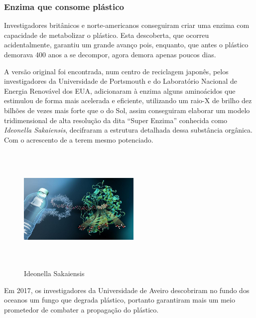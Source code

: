 \documentclass[letterpaper,12pt]{article}
\begin{document}
\subsubsection{Enzima que consome plástico}
\par \citep{wellewwwdwcom_2018_cientistas} Investigadores britânicos e norte-americanos conseguiram criar uma enzima com capacidade de metabolizar o plástico. Esta descoberta, que ocorreu acidentalmente, garantiu um grande avanço pois, enquanto, que antes o plástico demorava 400 anos a se decompor, agora demora apenas poucos dias.\\[0.1cm]
\begin{minipage}{0.5\linewidth}
\vspace{0.3cm}
    \par A versão original foi encontrada, num centro de reciclagem japonês, pelos investigadores da Universidade de Portsmouth e do Laboratório Nacional de Energia Renovável dos EUA, adicionaram à enzima alguns aminoácidos que estimulou de forma mais acelerada e eficiente, utilizando um raio-X de brilho dez bilhões de vezes mais forte que o do Sol, assim conseguiram elaborar um modelo tridimensional de alta resolução da dita “Super Enzima” conhecida como \textit{Ideonella Sakaiensis}, decifraram a estrutura detalhada dessa substância orgânica. Com o acrescento de a terem mesmo potenciado.\\[0.1cm]
\end{minipage}
\begin{minipage}{0.55\linewidth}
\begin{figure}[H]
    \centering
    \includegraphics[width = 220px, height = 230px]{enzima.jpg}
    \caption{Ideonella Sakaiensis}
    \label{fig:enzima}
\end{figure}
\end{minipage}
\par Em 2017, os investigadores da Universidade de Aveiro descobriram no fundo dos oceanos um fungo que degrada plástico, portanto garantiram mais um meio prometedor de combater a propagação do plástico.
\end{document}
